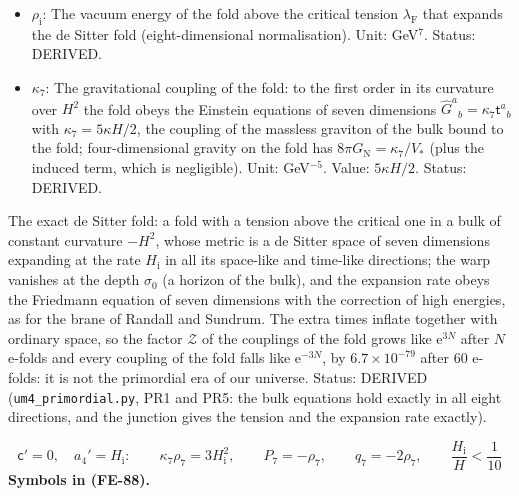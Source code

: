 \documentclass[
  10pt,
]{article}
\begin{document}
\begin{itemize}
  \(\rho_\Lambda\). Unit: GeV\(^7\). Value: \(12H/\kappa\);
  \(\lambda_{\mathrm{F}}V_* = 30H^2M_{\mathrm{red}}^2 = 1.1\times10^{45}\)
  GeV\(^4\) for \(H = 2534\) GeV. Status: DERIVED.
\item
  \(\rho_{\mathrm{i}}\): The vacuum energy of the fold above the
  critical tension \(\lambda_{\mathrm{F}}\) that expands the de Sitter
  fold (eight-dimensional normalisation). Unit: GeV\(^7\). Status:
  DERIVED.
\item
  \(\kappa_7\): The gravitational coupling of the fold: to the first
  order in its curvature over \(H^2\) the fold obeys the Einstein
  equations of seven dimensions
  \(\hat G^a{}_b = \kappa_7\mathsf{t}^a{}_b\) with
  \(\kappa_7 = 5\kappa H/2\), the coupling of the massless graviton of
  the bulk bound to the fold; four-dimensional gravity on the fold has
  \(8\pi G_{\mathrm{N}} = \kappa_7/V_*\) (plus the induced term, which
  is negligible). Unit: GeV\(^{-5}\). Value: \(5\kappa H/2\). Status:
  DERIVED.
\end{itemize}

The exact de Sitter fold: a fold with a tension above the critical one
in a bulk of constant curvature \(-H^2\), whose metric is a de Sitter
space of seven dimensions expanding at the rate \(H_{\mathrm{i}}\) in
all its space-like and time-like directions; the warp vanishes at the
depth \(\sigma_0\) (a horizon of the bulk), and the expansion rate obeys
the Friedmann equation of seven dimensions with the correction of high
energies, as for the brane of Randall and Sundrum. The extra times
inflate together with ordinary space, so the factor \(\mathcal{Z}\) of
the couplings of the fold grows like \(\mathrm{e}^{3N}\) after \(N\)
e-folds and every coupling of the fold falls like \(\mathrm{e}^{-3N}\),
by \(6.7\times10^{-79}\) after 60 e-folds: it is not the primordial era
of our universe. Status: DERIVED (\texttt{um4\_primordial.py}, PR1 and
PR5: the bulk equations hold exactly in all eight directions, and the
junction gives the tension and the expansion rate exactly).

\[
\mathsf{c}' = 0,\quad a_4' = H_{\mathrm{i}}:\qquad \kappa_7\rho_7 = 3H_{\mathrm{i}}^2,\qquad P_7 = -\rho_7,\qquad q_7 = -2\rho_7,\qquad
\frac{H_{\mathrm{i}}}{H} < \frac{1}{10} \tag{FE-88}
\] \textbf{Symbols in (FE-88).}
\end{document}
